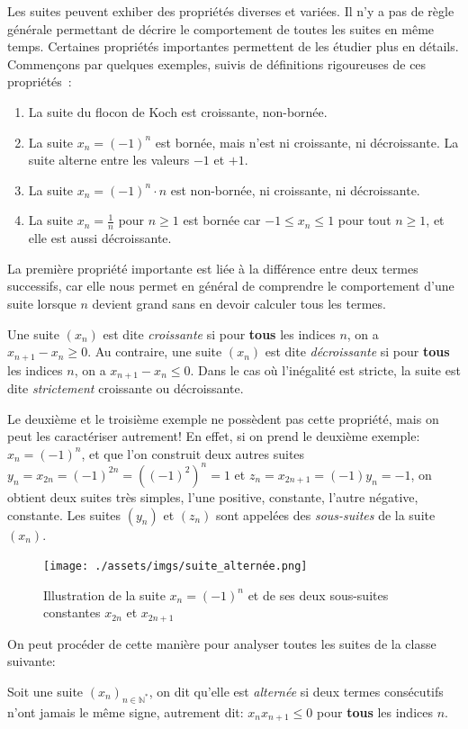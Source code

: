 Les suites peuvent exhiber des propriétés diverses et variées. Il n'y a pas de règle générale permettant de décrire le comportement de toutes les suites en même temps. Certaines propriétés importantes permettent de les étudier plus en détails. Commençons par quelques exemples, suivis de définitions rigoureuses de ces propriétés~:
\begin{enumerate}
    \item La suite du flocon de Koch est croissante, non-bornée.
    \item La suite $x_n = (-1)^n$ est bornée, mais n'est ni croissante, ni décroissante. La suite alterne entre les valeurs $-1$ et $+1$.
    \item La suite $x_n = (-1)^n \cdot n$ est non-bornée, ni croissante, ni décroissante.
    \item La suite $x_n = \frac{1}{n}$ pour $n \geq 1$ est bornée car $-1 \leq x_n \leq 1$ pour tout $n \geq 1$, et elle est aussi décroissante.
\end{enumerate}
La première propriété importante est liée à la différence entre deux termes successifs, car elle nous permet en général de comprendre le comportement d'une suite lorsque $n$ devient grand sans en devoir calculer tous les termes.
\begin{boxdef}
Une suite $(x_n)$ est dite \emph{croissante} si pour \textbf{tous} les indices $n$, on a $x_{n+1}-x_n \geq 0$. Au contraire, une suite $(x_n)$ est dite \emph{décroissante} si pour \textbf{tous} les indices $n$, on a $x_{n+1}-x_n \leq 0$. Dans le cas où l'inégalité est stricte, la suite est dite \emph{strictement} croissante ou décroissante.
\label{def:croissante-decroissante}
\end{boxdef}
Le deuxième et le troisième exemple ne possèdent pas cette propriété, mais on peut les caractériser autrement! En effet, si on prend le deuxième exemple: $x_n = (-1)^n$, et que l'on construit deux autres suites $y_n = x_{2n} =(-1)^{2n} = ((-1)^{2})^n = 1$ et $z_n = x_{2n+1} = (-1)y_n = -1$, on obtient deux suites très simples, l'une positive, constante, l'autre négative, constante. 
Les suites $(y_n)$ et $(z_n)$ sont appelées des \emph{sous-suites} de la suite $(x_n)$. 
\begin{figure}[H]
\centering \texttt{[image: ./assets/imgs/suite\_alternée.png]}
\caption{Illustration de la suite $x_n=(-1)^n$ et de ses deux sous-suites constantes $x_{2n}$ et $x_{2n+1}$}
\label{fig:suite_alternée}
\end{figure}
On peut procéder de cette manière pour analyser toutes les suites de la classe suivante:
\begin{boxdef} Soit une suite $(x_n)_{n\in\mathbb N^*}$, on dit qu'elle est \emph{alternée} si deux termes consécutifs n'ont jamais le même signe, autrement dit: $x_nx_{n+1}\leq 0$ pour \textbf{tous} les indices $n$.
\label{def:alternée}
\end{boxdef}





